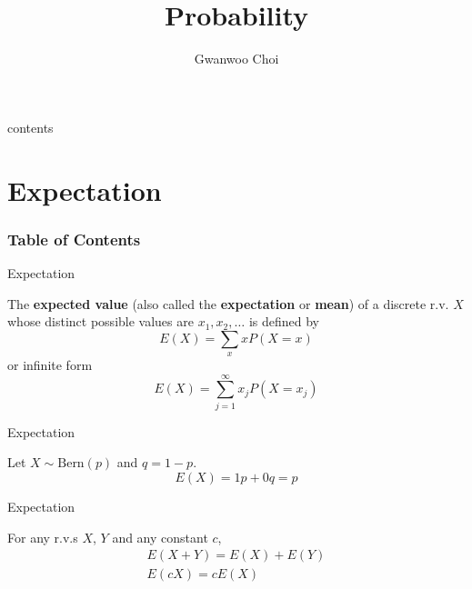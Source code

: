 \documentclass{beamer}
\title{Probability}
\author{Gwanwoo Choi}
\newcommand{\tb}[1]{\textbf{#1}}
\begin{document}
\begin{frame}
    \titlepage
\end{frame}

\begin{frame}{contents}
    \tableofcontents
\end{frame}

\section{Expectation}

\begin{frame}
    \frametitle{Table of Contents}
    \tableofcontents[currentsection]
\end{frame}


\begin{frame}{Expectation}
    \begin{definition}
        The \tb{expected value} (also called the \tb{expectation} or \tb{mean}) of a discrete r.v. $X$ whose distinct possible values are $x_1, x_2, \dots$ is defined by 
        \[
            E(X) = \sum_x x P(X=x)
        \]
        or infinite form
        \[
            E(X) = \sum^\infty_{j=1} x_j P(X=x_j)
        \]

    \end{definition}
\end{frame}

\begin{frame}{Expectation}
    \begin{example}
        Let $X \sim \text{Bern}(p)$ and $q = 1-p$.
        \[
            E(X) = 1p +0q = p
        \]
    \end{example}
\end{frame}

\begin{frame}{Expectation}
    \begin{theorem}
        For any r.v.s $X$, $Y$ and any constant $c$, 
        \[
        \begin{gathered}
            E(X+Y)=E(X) + E(Y)\\
            E(cX) = cE(X)
        \end{gathered}
        \]
    \end{theorem}
\end{frame}
\end{document}
